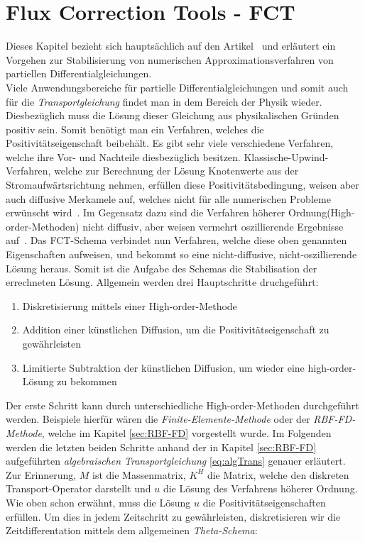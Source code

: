 \documentclass[12pt,titlepage]{article}
\begin{document}
\section{Flux Correction Tools - FCT}\label{sec:FCT}
Dieses Kapitel bezieht sich hauptsächlich auf den Artikel~\cite{kuzmin2002flux} und erläutert ein Vorgehen zur Stabilisierung von numerischen Approximationsverfahren von partiellen Differentialgleichungen.\\
Viele Anwendungsbereiche für partielle Differentialgleichungen und somit auch für die \textit{Transportgleichung} findet man in dem Bereich der Physik wieder. Diesbezüglich muss die Lösung dieser Gleichung aus physikalischen Gründen positiv sein. Somit benötigt man ein Verfahren, welches die Positivitätseigenschaft beibehält. Es gibt sehr viele verschiedene Verfahren, welche ihre Vor- und Nachteile diesbezüglich besitzen. Klassische-Upwind-Verfahren, welche zur Berechnung der Lösung Knotenwerte aus der Stromaufwärtsrichtung nehmen, erfüllen diese Positivitätsbedingung, weisen aber auch diffusive Merkamele auf, welches nicht für alle numerischen Probleme erwünscht wird~\cite{kuzmin2002flux}. Im Gegensatz dazu sind die Verfahren höherer Ordnung(High-order-Methoden) nicht diffusiv, aber weisen vermehrt oszillierende Ergebnisse auf~\cite{kuzmin2002flux}. Das FCT-Schema verbindet nun Verfahren, welche diese oben genannten Eigenschaften aufweisen, und bekommt so eine nicht-diffusive, nicht-oszillierende Lösung heraus. Somit ist die Aufgabe des Schemas die Stabilisation der errechneten Lösung. Allgemein werden drei Hauptschritte druchgeführt:
\begin{enumerate}
 \item Diskretisierung mittels einer High-order-Methode
 \item Addition einer künstlichen Diffusion, um die Positivitätseigenschaft zu gewährleisten
 \item Limitierte Subtraktion der künstlichen Diffusion, um wieder eine high-order-Lösung zu bekommen
\end{enumerate}
Der erste Schritt kann durch unterschiedliche High-order-Methoden durchgeführt werden. Beispiele hierfür wären die \textit{Finite-Elemente-Methode} oder der \textit{RBF-FD-Methode}, welche im Kapitel \ref{sec:RBF-FD} vorgestellt wurde. Im Folgenden werden die letzten beiden Schritte anhand der in Kapitel \ref{sec:RBF-FD} aufgeführten \textit{algebraischen Transportgleichung} \eqref{eq:algTrans} genauer erläutert. Zur Erinnerung, $M$ ist die Massenmatrix, $K^H$ die Matrix, welche den diskreten Transport-Operator darstellt und $u$ die Lösung des Verfahrens höherer Ordnung. Wie oben schon erwähnt, muss die Lösung $u$ die Positivitätseigenschaften erfüllen. Um dies in jedem Zeitschritt zu gewährleisten, diskretisieren wir die Zeitdifferentation mittels dem allgemeinen \textit{Theta-Schema}:
\end{document}
